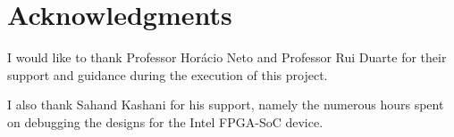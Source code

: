 \section*{Acknowledgments}

I would like to thank Professor Horácio Neto and Professor Rui Duarte for their support and guidance during the execution of this project.

I also thank Sahand Kashani for his support, namely the numerous hours spent on debugging the designs for the Intel \ac{FPGA}-\ac{SoC} device.
